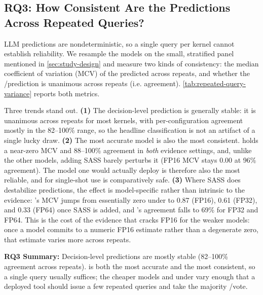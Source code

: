 \subsection{RQ3: How Consistent Are the Predictions Across Repeated Queries?}

LLM predictions are nondeterministic, so a single query per kernel cannot establish reliability.
We resample the models on the small, stratified panel mentioned in \autoref{sec:study-design} and measure two kinds of consistency: the median coefficient of variation (MCV) of the predicted \rai across repeats, and whether the \bandwidthbound/\computebound prediction is unanimous across repeats (i.e. agreement).
\autoref{tab:repeated-query-variance} reports both metrics.



Three trends stand out.
\textbf{(1)} The decision-level prediction is generally stable: it is unanimous across repeats for most kernels, with per-configuration agreement mostly in the 82--100\% range, so the headline classification is not an artifact of a single lucky draw.
\textbf{(2)} The most accurate model is also the most consistent.
\opus holds a near-zero MCV and 88--100\% agreement in \emph{both} evidence settings, and, unlike the other models, adding SASS barely perturbs it (FP16 MCV stays 0.00 at 96\% agreement).
The model one would actually deploy is therefore also the most reliable, and for \opus single-shot use is comparatively safe.
\textbf{(3)} Where SASS does destabilize predictions, the effect is model-specific rather than intrinsic to the evidence: \gptfivefour's MCV jumps from essentially zero under \sourceonly to 0.87 (FP16), 0.61 (FP32), and 0.33 (FP64) once SASS is added, and \gptoss's \sourcesass agreement falls to 69\% for FP32 and FP64.
This is the cost of the evidence that cracks FP16 for the weaker models: once a model commits to a numeric FP16 estimate rather than a degenerate zero, that estimate varies more across repeats.

\begin{rqsummary}
\textbf{RQ3 Summary:} Decision-level predictions are mostly stable (82--100\% agreement across repeats). \opus is both the most accurate and the most consistent, so a single query usually suffices; the cheaper models and \gptfivefour under \sourcesass vary enough that a deployed tool should issue a few repeated queries and take the majority \bandwidthbound/\computebound vote.
\end{rqsummary}






